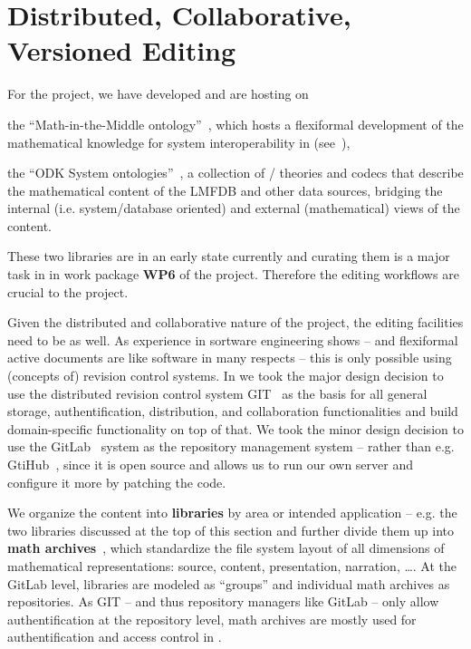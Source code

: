 \section{Distributed, Collaborative, Versioned Editing}\label{sec:editing}

For the \pn project, we have developed and are hosting on \sys
\begin{compactenum}
\item the ``Math-in-the-Middle ontology''~\cite{MitM:on}, which hosts a flexiformal
  development of the mathematical knowledge for system interoperability in \pn
  (see~\cite{DehKohKon:iop16,ODK-D6.2}),
\item the ``ODK System ontologies''~\cite{ODKsysonto:on}, a collection of \omdoc/\mmt
  theories and codecs that describe the mathematical content of the LMFDB and other data
  sources, bridging the internal (i.e. system/database oriented) and external
  (mathematical) views of the content.
\end{compactenum}
These two \sys libraries are in an early state currently and curating them is a major task
in in work package \textbf{WP6} of the \pn project. Therefore the editing workflows are
crucial to the project.

Given the distributed and collaborative nature of the \pn project, the editing facilities
need to be as well. As experience in sortware engineering shows -- and flexiformal active
documents are like software in many respects -- this is only possible using (concepts of)
revision control systems. In \sys we took the major design decision to use the distributed
revision control system GIT~\cite{GIT:on} as the basis for all general storage,
authentification, distribution, and collaboration functionalities and build
domain-specific functionality on top of that. We took the minor design decision to use the
GitLab~\cite{GitLab:on} system as the repository management system -- rather than e.g.
GtiHub~\cite{GitHub:on}, since it is open source and allows us to run our own server and
configure it more by patching the code.

We organize the content into \textbf{libraries} by area or intended application --
e.g. the two libraries discussed at the top of this section and further divide them up
into \textbf{math archives}~\cite{HorIacJuc:cscpnrr11}, which standardize the file system
layout of all dimensions of mathematical representations: source, content, presentation,
narration, \ldots. At the GitLab level, libraries are modeled as ``groups'' and individual
math archives as repositories. As GIT -- and thus repository managers like GitLab -- only
allow authentification at the repository level, math archives are mostly used for
authentification and access control in \sys.

